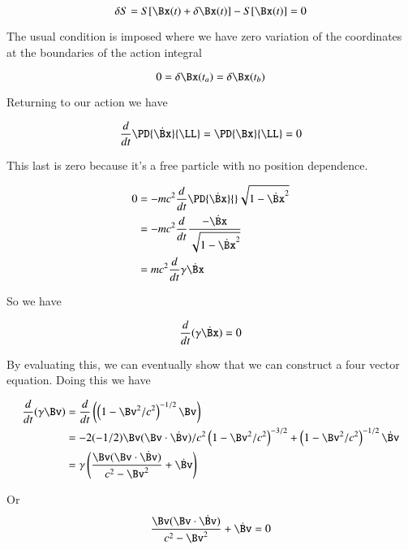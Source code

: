 \begin{equation}\label{eqn:relativisticElectrodynamicsL7:230}
\delta S = S[\Bx(t) + \delta \Bx(t)] - S[ \Bx(t) ] = 0
\end{equation}

The usual condition is imposed where we have zero variation of the coordinates at the boundaries of the action integral

\begin{equation}\label{eqn:relativisticElectrodynamicsL7:231}
0 = \delta \Bx(t_a) = \delta \Bx(t_b) 
\end{equation}

Returning to our action we have

\begin{equation}\label{eqn:relativisticElectrodynamicsL7:240}
\frac{d}{dt} \PD{\dot{\Bx}}{\LL} = \PD{\Bx}{\LL} = 0
\end{equation}

This last is zero because it's a free particle with no position dependence.

\begin{align*}
0 
&= -m c^2 \frac{d}{dt} \PD{\dot{\Bx}}{} \sqrt{ 1 - \dot{\Bx}^2 } \\
&= -m c^2 \frac{d}{dt} \frac{- \dot{\Bx}}{\sqrt{ 1 - \dot{\Bx}^2 } } \\
&= m c^2 \frac{d}{dt} \gamma \dot\Bx
\end{align*}

So we have

\begin{equation}\label{eqn:relativisticElectrodynamicsL7:241}
\frac{d}{dt} (\gamma \dot{\Bx}) = 0
\end{equation}

By evaluating this, we can eventually show that we can construct a four vector equation.  Doing this we have

\begin{align*}
\frac{d}{dt} (\gamma \Bv) 
&=
\frac{d}{dt} \left( \left(1 - \Bv^2/c^2\right)^{-1/2} \Bv \right) \\
&=
-2 (-1/2) \Bv (\Bv \cdot \dot{\Bv})/c^2 \left(1 - \Bv^2/c^2\right)^{-3/2} + \left(1 - \Bv^2/c^2\right)^{-1/2} \dot{\Bv} \\
&=
\gamma \left( \frac{\Bv (\Bv \cdot \dot{\Bv}) }{ c^2 - \Bv^2 } + \dot{\Bv} \right)
\end{align*}

Or
\begin{equation}\label{eqn:relativisticElectrodynamicsL7:242}
\frac{\Bv (\Bv \cdot \dot{\Bv}) }{ c^2 - \Bv^2 } + \dot{\Bv} = 0
\end{equation}

